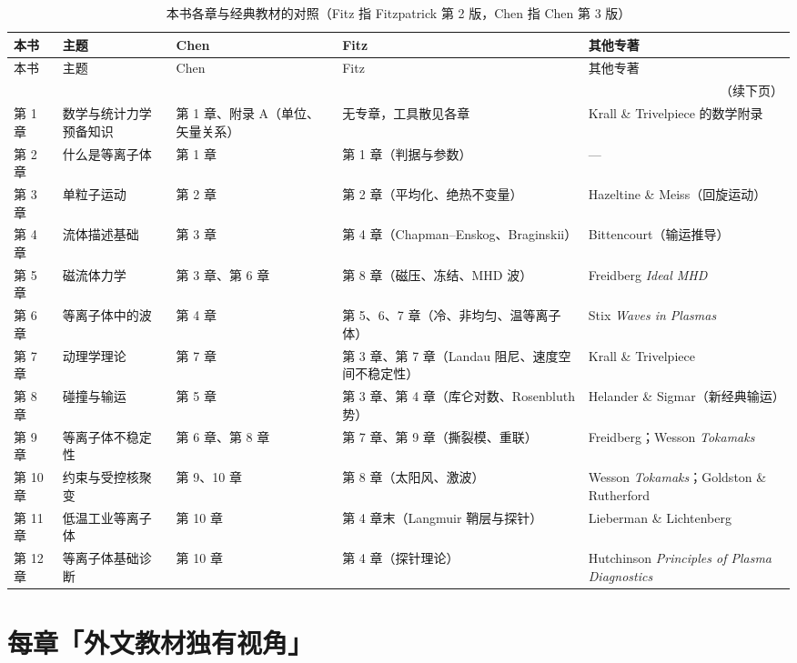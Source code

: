 \small
\begin{longtable}{@{}p{2.7cm}p{2.5cm}p{2.5cm}p{3.2cm}p{3.0cm}@{}}
\caption{本书各章与经典教材的对照（Fitz 指 Fitzpatrick 第 2 版，Chen 指 Chen 第 3 版）}\label{tab:app-j-map}\\
\toprule
本书 & 主题 & Chen & Fitz & 其他专著 \\
\midrule
\endfirsthead
\toprule
本书 & 主题 & Chen & Fitz & 其他专著 \\
\midrule
\endhead
\midrule
\multicolumn{5}{r}{\small（续下页）}\\
\endfoot
\bottomrule
\endlastfoot
第 1 章 & 数学与统计力学预备知识 & 第 1 章、附录 A（单位、矢量关系） & 无专章，工具散见各章 & Krall \& Trivelpiece 的数学附录 \\
第 2 章 & 什么是等离子体 & 第 1 章 & 第 1 章（判据与参数） & --- \\
第 3 章 & 单粒子运动 & 第 2 章 & 第 2 章（平均化、绝热不变量） & Hazeltine \& Meiss（回旋运动） \\
第 4 章 & 流体描述基础 & 第 3 章 & 第 4 章（Chapman--Enskog、Braginskii） & Bittencourt（输运推导） \\
第 5 章 & 磁流体力学 & 第 3 章、第 6 章 & 第 8 章（磁压、冻结、MHD 波） & Freidberg \textit{Ideal MHD} \\
第 6 章 & 等离子体中的波 & 第 4 章 & 第 5、6、7 章（冷、非均匀、温等离子体） & Stix \textit{Waves in Plasmas} \\
第 7 章 & 动理学理论 & 第 7 章 & 第 3 章、第 7 章（Landau 阻尼、速度空间不稳定性） & Krall \& Trivelpiece \\
第 8 章 & 碰撞与输运 & 第 5 章 & 第 3 章、第 4 章（库仑对数、Rosenbluth 势） & Helander \& Sigmar（新经典输运） \\
第 9 章 & 等离子体不稳定性 & 第 6 章、第 8 章 & 第 7 章、第 9 章（撕裂模、重联） & Freidberg；Wesson \textit{Tokamaks} \\
第 10 章 & 约束与受控核聚变 & 第 9、10 章 & 第 8 章（太阳风、激波） & Wesson \textit{Tokamaks}；Goldston \& Rutherford \\
第 11 章 & 低温工业等离子体 & 第 10 章 & 第 4 章末（Langmuir 鞘层与探针） & Lieberman \& Lichtenberg \\
第 12 章 & 等离子体基础诊断 & 第 10 章 & 第 4 章（探针理论） & Hutchinson \textit{Principles of Plasma Diagnostics} \\
\end{longtable}
\normalsize


\section{每章「外文教材独有视角」}

